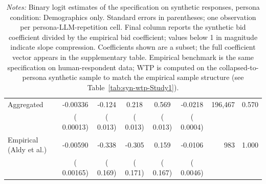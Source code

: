 \begin{table}[h]
\begin{threeparttable}
\begin{tabular}{lcccccrr}
\midrule
Aggregated &  -0.00336 &  -0.124 &   0.218 &   0.569 & -0.0218 &   196,467 &  0.570 \\
 & (  0.00013) & (  0.013) & (  0.013) & (  0.013) & ( 0.0004) & & \\
\midrule
Empirical (Aldy et al.) &  -0.00590 &  -0.338 &  -0.305 &   0.159 & -0.0106 &       983 & 1.000 \\
 & (  0.00165) & (  0.169) & (  0.171) & (  0.167) & ( 0.0046) & & \\
\bottomrule
\end{tabular}
\caption*{\footnotesize \textit{Notes:} Binary logit estimates of the \textcite{Aldy2012} specification on synthetic responses, persona condition: Demographics only. 
Standard errors in parentheses; one observation per persona-LLM-repetition cell. 
Final column reports the synthetic bid coefficient divided by the empirical bid coefficient; values below 1 in magnitude indicate slope compression. 
Coefficients shown are a subset; the full coefficient vector appears in the supplementary table. 
Empirical benchmark is the same specification on \textcite{Aldy2012} human-respondent data; WTP is computed on the collapsed-to-persona synthetic sample to match the empirical sample structure (see Table~\ref{tab:syn-wtp-Study1}).}
\end{threeparttable}
\end{table}
